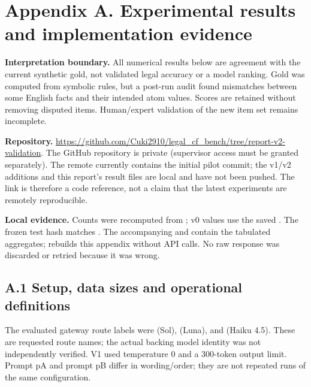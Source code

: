 \clearpage

\pagestyle{plain}

\appendix

\section*{Appendix A. Experimental results and implementation evidence}


\textbf{Interpretation boundary.} All numerical results below are agreement with the current synthetic gold, not validated legal accuracy or a model ranking. Gold was computed from symbolic rules, but a post-run audit found mismatches between some English facts and their intended atom values. Scores are retained without removing disputed items. Human/expert validation of the new item set remains incomplete.

\textbf{Repository.} \url{https://github.com/Cuki2910/legal_cf_bench/tree/report-v2-validation}. The GitHub repository is private (supervisor access must be granted separately). The remote currently contains the initial pilot commit; the v1/v2 additions and this report's result files are local and have not been pushed. The link is therefore a code reference, not a claim that the latest experiments are remotely reproducible.

\textbf{Local evidence.} Counts were recomputed from ; v0 values use the saved . The frozen test hash matches . The accompanying  and  contain the tabulated aggregates;  rebuilds this appendix without API calls. No raw response was discarded or retried because it was wrong.

\subsection*{A.1 Setup, data sizes and operational definitions}

The evaluated gateway route labels were  (Sol),  (Luna), and  (Haiku 4.5). These are requested route names; the actual backing model identity was not independently verified. V1 used temperature 0 and a 300-token output limit. Prompt pA and prompt pB differ in wording/order; they are not repeated runs of the same configuration.

